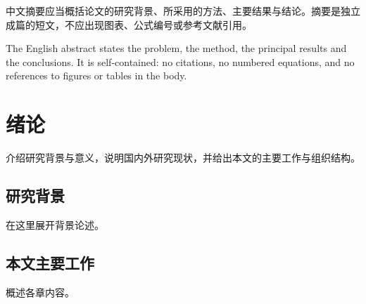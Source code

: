 \documentclass[type=master,fontset=fandol,newtxmath=false]{hithesis}
\begin{document}
\begin{cabstract}
  中文摘要应当概括论文的研究背景、所采用的方法、主要结果与结论。摘要是独立
  成篇的短文，不应出现图表、公式编号或参考文献引用。
\end{cabstract}

\begin{eabstract}
  The English abstract states the problem, the method, the principal results
  and the conclusions. It is self-contained: no citations, no numbered
  equations, and no references to figures or tables in the body.
\end{eabstract}

\makecover

\frontmatter
\tableofcontents

\mainmatter

\chapter{绪论}
\label{chap:intro}
介绍研究背景与意义，说明国内外研究现状，并给出本文的主要工作与组织结构。

\section{研究背景}
在这里展开背景论述。

\section{本文主要工作}
概述各章内容。
\end{document}
